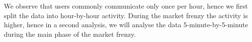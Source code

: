 
We observe that users commonly communicate only once per hour, hence we first split the data into hour-by-hour activity. During the market frenzy the activity is higher, hence in a second analysis, we will analyse the data 5-minute-by-5-minute during the main phase of the market frenzy.



